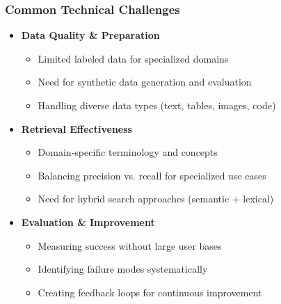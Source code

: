 {    \begin{frame}
        \frametitle{Common Technical Challenges}
        \begin{itemize}
            \item \textbf{Data Quality \& Preparation}
            \begin{itemize}
                \item Limited labeled data for specialized domains
                \item Need for synthetic data generation and evaluation
                \item Handling diverse data types (text, tables, images, code)
            \end{itemize}
            \item \textbf{Retrieval Effectiveness}
            \begin{itemize}
                \item Domain-specific terminology and concepts
                \item Balancing precision vs. recall for specialized use cases
                \item Need for hybrid search approaches (semantic + lexical)
            \end{itemize}
            \item \textbf{Evaluation \& Improvement}
            \begin{itemize}
                \item Measuring success without large user bases
                \item Identifying failure modes systematically
                \item Creating feedback loops for continuous improvement
            \end{itemize}
        \end{itemize}
    \end{frame}

}
